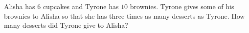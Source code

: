 Alisha has $6$ cupcakes and Tyrone has $10$ brownies. Tyrone gives some of his brownies to Alisha so that she has three times as many desserts as Tyrone. How many desserts did Tyrone give to Alisha?
